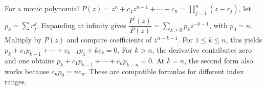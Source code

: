 For a monic polynomial $P(z)=z^n+c_1z^{n-1}+\cdots+c_n=\prod_{j=1}^n(z-r_j)$, let $p_k=\sum r_j^k$. Expanding at infinity gives $\dfrac{P^{\prime} (z)}{P (z)} = \sum_{k\ge0} p_k z^{-k-1}$, with $p_0=n$. Multiply by $P(z)$ and compare coefficients of $z^{n-k-1}$. For $1\le k\le n$, this yields $\boxed{p_k+c_1p_{k-1}+\cdots+c_{k-1}p_1+kc_k=0}$. For $k>n$, the derivative contributes zero and one obtains $\boxed{p_k+c_1p_{k-1}+\cdots+c_np_{k-n}=0}$. At $k=n$, the second form also works because $c_np_0=nc_n$. These are compatible formulas for different index ranges.
